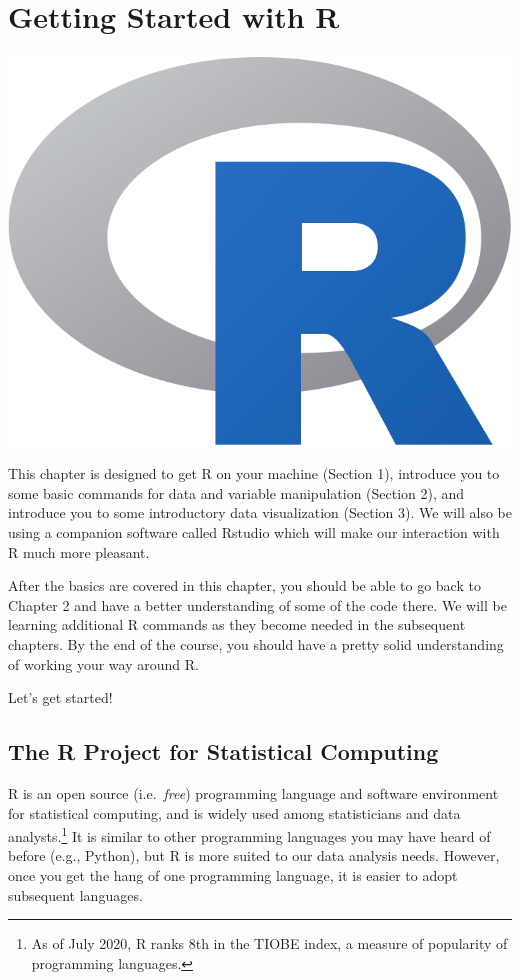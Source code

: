 \documentclass[
]{book}
\begin{document}
\hypertarget{R}{%
\chapter{Getting Started with R}\label{R}}

\begin{center}\includegraphics[width=0.4\linewidth]{images/Rlogo} \end{center}

This chapter is designed to get R on your machine (Section 1), introduce you to some basic commands for data and variable manipulation (Section 2), and introduce you to some introductory data visualization (Section 3). We will also be using a companion software called Rstudio which will make our interaction with R much more pleasant.

After the basics are covered in this chapter, you should be able to go back to Chapter 2 and have a better understanding of some of the code there. We will be learning additional R commands as they become needed in the subsequent chapters. By the end of the course, you should have a pretty solid understanding of working your way around R.

Let's get started!

\hypertarget{the-r-project-for-statistical-computing}{%
\section{The R Project for Statistical Computing}\label{the-r-project-for-statistical-computing}}

R is an open source (i.e.~\emph{free}) programming language and software environment for statistical computing, and is widely used among statisticians and data analysts.\footnote{As of July 2020, R ranks 8th in the TIOBE index, a measure of popularity of programming languages.} It is similar to other programming languages you may have heard of before (e.g., Python), but R is more suited to our data analysis needs. However, once you get the hang of one programming language, it is easier to adopt subsequent languages.
\end{document}
